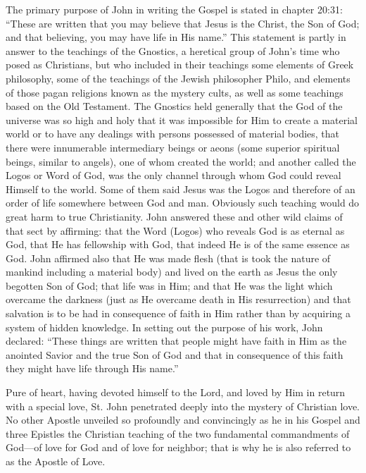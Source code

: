 The primary purpose of John in writing the Gospel is stated in chapter 20:31: ``These are written that you may believe that Jesus is the Christ, the Son of God; and that believing, you may have life in His name.'' This statement is partly in answer to the teachings of the Gnostics, a heretical group of John's time who posed as Christians, but who included in their teachings some elements of Greek philosophy, some of the teachings of the Jewish philosopher Philo, and elements of those pagan religions known as the mystery cults, as well as some teachings based on the Old Testament. The Gnostics held generally that the God of the universe was so high and holy that it was impossible for Him to create a material world or to have any dealings with persons possessed of material bodies, that there were innumerable intermediary beings or aeons (some superior spiritual beings, similar to angels), one of whom created the world; and another called the Logos or Word of God, was the only channel through whom God could reveal Himself to the world. Some of them said Jesus was the Logos and therefore of an order of life somewhere between God and man. Obviously such teaching would do great harm to true Christianity. John answered these and other wild claims of that sect by affirming: that the Word (Logos) who reveals God is as eternal as God, that He has fellowship with God, that indeed He is of the same essence as God. John affirmed also that He was made flesh (that is took the nature of mankind including a material body) and lived on the earth as Jesus the only begotten Son of God; that life was in Him; and that He was the light which overcame the darkness (just as He overcame death in His resurrection) and that salvation is to be had in consequence of faith in Him rather than by acquiring a system of hidden knowledge. In setting out the purpose of his work, John declared: ``These things are written that people might have faith in Him as the anointed Savior and the true Son of God and that in consequence of this faith they might have life through His name.''

Pure of heart, having devoted himself to the Lord, and loved by Him in return with a special love, St. John penetrated deeply into the mystery of Christian love. No other Apostle unveiled so profoundly and convincingly as he in his Gospel and three Epistles the Christian teaching of the two fundamental commandments of God---of love for God and of love for neighbor; that is why he is also referred to as the Apostle of Love.

